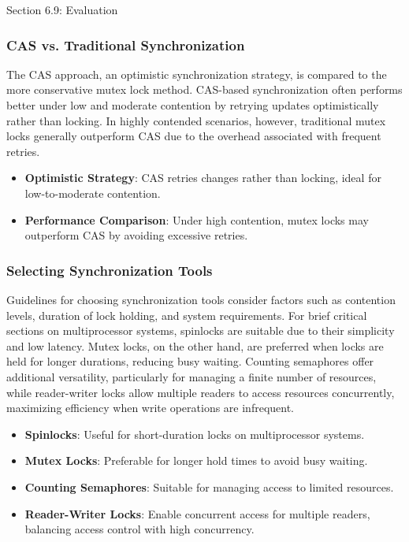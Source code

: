 \begin{notes}{Section 6.9: Evaluation}
    \subsubsection*{CAS vs. Traditional Synchronization}
    
    The CAS approach, an optimistic synchronization strategy, is compared to the more conservative mutex lock method. CAS-based synchronization often performs better under low and moderate contention 
    by retrying updates optimistically rather than locking. In highly contended scenarios, however, traditional mutex locks generally outperform CAS due to the overhead associated with frequent retries. 
    
    \begin{highlight}
    
        \begin{itemize}
            \item \textbf{Optimistic Strategy}: CAS retries changes rather than locking, ideal for low-to-moderate contention.
            \item \textbf{Performance Comparison}: Under high contention, mutex locks may outperform CAS by avoiding excessive retries.
        \end{itemize}
    
    \end{highlight}
    
    \subsubsection*{Selecting Synchronization Tools}
    
    Guidelines for choosing synchronization tools consider factors such as contention levels, duration of lock holding, and system requirements. For brief critical sections on multiprocessor systems, 
    spinlocks are suitable due to their simplicity and low latency. Mutex locks, on the other hand, are preferred when locks are held for longer durations, reducing busy waiting. Counting semaphores 
    offer additional versatility, particularly for managing a finite number of resources, while reader-writer locks allow multiple readers to access resources concurrently, maximizing efficiency when 
    write operations are infrequent.
    
    \begin{highlight}
    
        \begin{itemize}
            \item \textbf{Spinlocks}: Useful for short-duration locks on multiprocessor systems.
            \item \textbf{Mutex Locks}: Preferable for longer hold times to avoid busy waiting.
            \item \textbf{Counting Semaphores}: Suitable for managing access to limited resources.
            \item \textbf{Reader-Writer Locks}: Enable concurrent access for multiple readers, balancing access control with high concurrency.
        \end{itemize}
    

\end{highlight}
\end{notes}
